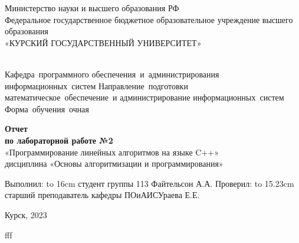 \documentclass[a4paper,14pt]{extreport} %
\begin{document}
	\begin{titlepage}
		
		\begin{center}
			\vfill
			
			Министерство науки и высшего образования РФ\\
			Федеральное государственное бюджетное образовательное учреждение
			высшего образования\\
			«КУРСКИЙ ГОСУДАРСТВЕННЫЙ УНИВЕРСИТЕТ»\\
			\ \\
			\vspace{1em}
	
			\hfill\vbox
			{
				\hbox{\hspace{1cm}Кафедра программного}
				\hbox{обеспечения и администрирования}
				\hbox{информационных систем}
				\hbox{\hspace{1cm}Направление подготовки}
				\hbox{математическое обеспечение и}
				\hbox{администрирование}
				\hbox{информационных систем}
				\hbox{\hspace{1cm}Форма обучения очная}
			}
			
			\vfill
			
			{\bf Отчет\\
				по лабораторной работе №2\\}
			«Программирование линейных алгоритмов на языке C++»\\
			дисциплина «Основы алгоритмизации и программирования»\\
			
			\vfill
			
			{
				
				\hbox{Выполнил:}
				\hbox to 16cm {студент группы 113 \hfill Файтельсон А.А.}
				\hbox{}
				\hbox{Проверил:}
				\hbox to 15.23cm {старший преподаватель кафедры ПОиАИС\hfill Ураева Е.Е.}%
			}
			
			\vfill
			
			Курск, 2023
		\end{center}
		
	\end{titlepage}
	
	\setcounter{page}{2} 
	\newpage
	fff
\end{document}
